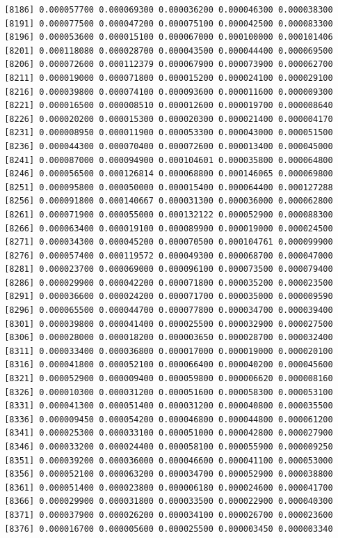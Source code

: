 \documentclass[]{article}
\begin{document}
\begin{verbatim}
 [8186] 0.000057700 0.000069300 0.000036200 0.000046300 0.000038300
 [8191] 0.000077500 0.000047200 0.000075100 0.000042500 0.000083300
 [8196] 0.000053600 0.000015100 0.000067000 0.000100000 0.000101406
 [8201] 0.000118080 0.000028700 0.000043500 0.000044400 0.000069500
 [8206] 0.000072600 0.000112379 0.000067900 0.000073900 0.000062700
 [8211] 0.000019000 0.000071800 0.000015200 0.000024100 0.000029100
 [8216] 0.000039800 0.000074100 0.000093600 0.000011600 0.000009300
 [8221] 0.000016500 0.000008510 0.000012600 0.000019700 0.000008640
 [8226] 0.000020200 0.000015300 0.000020300 0.000021400 0.000004170
 [8231] 0.000008950 0.000011900 0.000053300 0.000043000 0.000051500
 [8236] 0.000044300 0.000070400 0.000072600 0.000013400 0.000045000
 [8241] 0.000087000 0.000094900 0.000104601 0.000035800 0.000064800
 [8246] 0.000056500 0.000126814 0.000068800 0.000146065 0.000069800
 [8251] 0.000095800 0.000050000 0.000015400 0.000064400 0.000127288
 [8256] 0.000091800 0.000140667 0.000031300 0.000036000 0.000062800
 [8261] 0.000071900 0.000055000 0.000132122 0.000052900 0.000088300
 [8266] 0.000063400 0.000019100 0.000089900 0.000019000 0.000024500
 [8271] 0.000034300 0.000045200 0.000070500 0.000104761 0.000099900
 [8276] 0.000057400 0.000119572 0.000049300 0.000068700 0.000047000
 [8281] 0.000023700 0.000069000 0.000096100 0.000073500 0.000079400
 [8286] 0.000029900 0.000042200 0.000071800 0.000035200 0.000023500
 [8291] 0.000036600 0.000024200 0.000071700 0.000035000 0.000009590
 [8296] 0.000065500 0.000044700 0.000077800 0.000034700 0.000039400
 [8301] 0.000039800 0.000041400 0.000025500 0.000032900 0.000027500
 [8306] 0.000028000 0.000018200 0.000003650 0.000028700 0.000032400
 [8311] 0.000033400 0.000036800 0.000017000 0.000019000 0.000020100
 [8316] 0.000041800 0.000052100 0.000066400 0.000040200 0.000045600
 [8321] 0.000052900 0.000009400 0.000059800 0.000006620 0.000008160
 [8326] 0.000010300 0.000031200 0.000051600 0.000058300 0.000053100
 [8331] 0.000041300 0.000051400 0.000031200 0.000040800 0.000035500
 [8336] 0.000009450 0.000054200 0.000046800 0.000044800 0.000061200
 [8341] 0.000025300 0.000033100 0.000051000 0.000042800 0.000027900
 [8346] 0.000033200 0.000024400 0.000058100 0.000055900 0.000009250
 [8351] 0.000039200 0.000036000 0.000046600 0.000041100 0.000053000
 [8356] 0.000052100 0.000063200 0.000034700 0.000052900 0.000038800
 [8361] 0.000051400 0.000023800 0.000006180 0.000024600 0.000041700
 [8366] 0.000029900 0.000031800 0.000033500 0.000022900 0.000040300
 [8371] 0.000037900 0.000026200 0.000034100 0.000026700 0.000023600
 [8376] 0.000016700 0.000005600 0.000025500 0.000003450 0.000003340

\end{verbatim}
\end{document}
